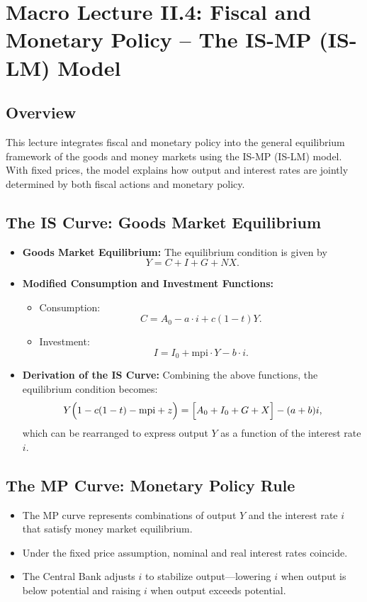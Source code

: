 \chapter*{Macro Lecture II.4: Fiscal and Monetary Policy -- The IS-MP (IS-LM) Model}
\section*{Overview}
This lecture integrates fiscal and monetary policy into the general equilibrium framework of the goods and money markets using the IS-MP (IS-LM) model. With fixed prices, the model explains how output and interest rates are jointly determined by both fiscal actions and monetary policy.

\section*{The IS Curve: Goods Market Equilibrium}
\begin{itemize}
    \item \textbf{Goods Market Equilibrium:} The equilibrium condition is given by
    \[
    Y = C + I + G + NX.
    \]
    \item \textbf{Modified Consumption and Investment Functions:}
    \begin{itemize}
        \item Consumption: 
        \[
        C = A_0 - a \cdot i + c(1-t)Y.
        \]
        \item Investment:
        \[
        I = I_0 + \text{mpi} \cdot Y - b \cdot i.
        \]
    \end{itemize}
    \item \textbf{Derivation of the IS Curve:} Combining the above functions, the equilibrium condition becomes:
    \[
    Y\Bigl(1 - c(1-t) - \text{mpi} + z\Bigr) = \Bigl[A_0 + I_0 + G + X\Bigr] - (a+b)i,
    \]
    which can be rearranged to express output \(Y\) as a function of the interest rate \(i\).
\end{itemize}

\section*{The MP Curve: Monetary Policy Rule}
\begin{itemize}
    \item The MP curve represents combinations of output \(Y\) and the interest rate \(i\) that satisfy money market equilibrium.
    \item Under the fixed price assumption, nominal and real interest rates coincide.
    \item The Central Bank adjusts \(i\) to stabilize output---lowering \(i\) when output is below potential and raising \(i\) when output exceeds potential.
\end{itemize}

